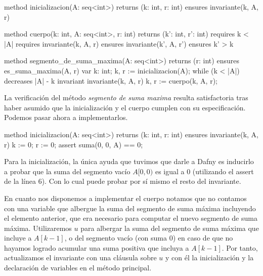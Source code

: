 \documentclass[12pt, a4paper, openany, fleqn]{book}
\begin{document}
    \begin{greenbox}
    \begin{dafny}[gobble=8]
        method inicializacion(A: seq<int>) returns (k: int, r: int)
            ensures invariante(k, A, r)

        method cuerpo(k: int, A: seq<int>, r: int) returns (k': int, r': int)
            requires k < |A|
            requires invariante(k, A, r)
            ensures invariante(k', A, r')
            ensures k' > k

        method segmento_de_suma_maxima(A: seq<int>) returns (r: int)
            ensures es_suma_maxima(A, r)
        {
            var k: int;
            k, r := inicializacion(A);
            while (k < |A|)
                decreases |A| - k
                invariant invariante(k, A, r)
            {
                k, r := cuerpo(k, A, r);
            }
        }
    \end{dafny}
    \end{greenbox}

    La verificación del método \textit{segmento de suma maxima} resulta satisfactoria tras haber asumido que la inicialización y el cuerpo cumplen con su especificación. Podemos pasar ahora a implementarlos.

    \begin{greenbox}
    \begin{dafny}[gobble=8]
        method inicializacion(A: seq<int>) returns (k: int, r: int)
            ensures invariante(k, A, r)
        {
            k := 0;
            r := 0;
            assert suma(0, 0, A) == 0;
        }
    \end{dafny}
    \end{greenbox}

    Para la inicialización, la única ayuda que tuvimos que darle a Dafny es inducirlo a probar que la suma del segmento vacío $A[0,0)$ es igual a 0 (utilizando el assert de la línea 6). Con lo cual puede probar por sí mismo el resto del invariante.

    En cuanto nos disponemos a implementar el cuerpo notamos que no contamos con una variable que albergue la suma del segmento de suma máxima incluyendo el elemento anterior, que era necesario para computar el nuevo segmento de suma máxima.
    Utilizaremos $u$ para albergar la suma del segmento de suma máxima que incluye a $A[k-1]$, o del segmento vacío (con suma $0$) en caso de que no hayamos logrado acumular una suma positiva que incluya a $A[k-1]$. Por tanto, actualizamos el invariante con una cláusula sobre $u$ y con él la inicialización y la declaración de variables en el método principal.
\end{document}

